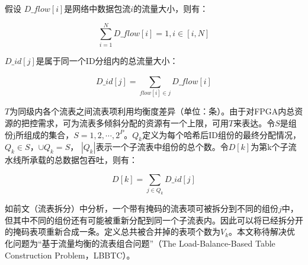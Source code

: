 假设 $D\_flow[i]$是网络中数据包流$ i $的流量大小，则有：

\begin{equation} \label{pl3}
\sum_{i=1}^{N}D\_flow[i]=1,i \in [i,N]
\end{equation}

$D\_id[j]$是属于同一个ID分组内的总流量大小：

\begin{equation} \label{pl4}
D\_id[j]=\sum_{flow[i]\in j}^{}D\_flow[i]
\end{equation}

$T$为同级内各个流表之间流表项利用均衡度差异（单位：条）。由于对FPGA内总资源的把控需求，可为流表多倾斜分配的资源有一个上限，可用$T$来表达。令$S$是组份j所组成的集合，$S={1,2,\cdots,2^P}$。$Q_k$定义为每个哈希后ID组份的最终分配情况，$Q_k \in S$，$\cup Q_k=S$， $|Q_k|$表示一个子流表中组份的总个数。令$D[k]$为第k个子流水线所承载的总数据包吞吐，则有：

\begin{equation} \label{pl5}
D[k]=\sum_{j\in Q_k}D\_id[j]
\end{equation}

如前文（流表拆分）中分析，一个带有掩码的流表项可被拆分到不同的组份$ j $中，但其中不同的组份还有可能被重新分配到同一个子流表内。因此可以将已经拆分开的掩码表项重新合成一条。定义总共被合并掉的表项个数为$V_k$。本文称待解决优化问题为“基于流量均衡的流表组合问题”（The Load-Balance-Based Table Construction Problem，LBBTC）。

